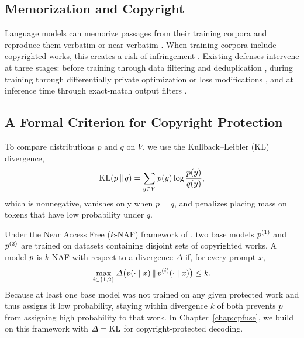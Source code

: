 \subsection{Memorization and Copyright}

Language models can memorize passages from their training corpora and reproduce them verbatim or near-verbatim \citep{carlini2021extracting,carlini2023quantifying,nasr2023scalable}. When training corpora include copyrighted works, this creates a risk of infringement \citep{sag66new,henderson2023foundation}. Existing defenses intervene at three stages: before training through data filtering and deduplication \citep{lee2021deduplicating,min2023silo}, during training through differentially private optimization \citep{abadi2016deep} or loss modifications \citep{hans2024like}, and at inference time through exact-match output filters \citep{ippolito2023preventing}.

\subsection{A Formal Criterion for Copyright Protection}

To compare distributions \(p\) and \(q\) on \(V\), we use the Kullback--Leibler (KL) divergence,
\[
  \operatorname{KL}(p \,\|\, q) = \sum_{y \in V} p(y) \log \frac{p(y)}{q(y)},
\]
which is nonnegative, vanishes only when \(p = q\), and penalizes placing mass on tokens that have low probability under \(q\).

Under the Near Access Free (\(k\)-NAF) framework of \citet{vyas2023provable}, two base models \(p^{(1)}\) and \(p^{(2)}\) are trained on datasets containing disjoint sets of copyrighted works. A model \(p\) is \(k\)-NAF with respect to a divergence \(\Delta\) if, for every prompt \(x\),
\[
  \max_{i \in \{1, 2\}} \Delta\bigl(p(\cdot \mid x) \,\|\, p^{(i)}(\cdot \mid x)\bigr) \leq k.
\]
Because at least one base model was not trained on any given protected work and thus assigns it low probability, staying within divergence \(k\) of both prevents \(p\) from assigning high probability to that work. In Chapter~\ref{chap:cpfuse}, we build on this framework with \(\Delta = \operatorname{KL}\) for copyright-protected decoding.

